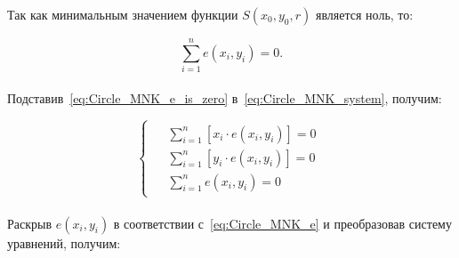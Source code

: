 Так как минимальным значением функции $S(x_0, y_0, r)$ является ноль, то:

\begin{equation}
    \label{eq:Circle_MNK_e_is_zero}
    \sum_{i=1}^{n} e(x_i, y_i) = 0.
\end{equation} \\

Подставив~\ref{eq:Circle_MNK_e_is_zero} в~\ref{eq:Circle_MNK_system}, получим:

\begin{equation*}
    \begin{cases}
        \begin{aligned}
            &\sum_{i=1}^{n} \left[ x_i \cdot e(x_i, y_i) \right] = 0 \\
            &\sum_{i=1}^{n} \left[ y_i \cdot e(x_i, y_i) \right] = 0 \\
            &\sum_{i=1}^{n} e(x_i, y_i) = 0
        \end{aligned}
    \end{cases}
\end{equation*} \\

Раскрыв $e(x_i, y_i)$ в соответствии с~\ref{eq:Circle_MNK_e} и преобразовав систему уравнений, получим:

